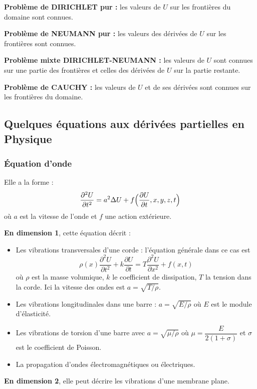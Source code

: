 \textbf{Problème de DIRICHLET pur :} les valeurs de $U$ sur les frontières du
domaine sont connues.

\textbf{Problème de NEUMANN pur :} les valeurs des dérivées de $U$ sur les
frontières sont connues.

\textbf{Problème mixte DIRICHLET-NEUMANN :} les valeurs de $U$ sont connues
sur une partie des frontières et celles des dérivées de $U$ sur la partie
restante.

\textbf{Problème de CAUCHY :} les valeurs de $U$ et de ses dérivées sont
connues sur les frontières du domaine.

\subsection{Quelques équations aux dérivées partielles en Physique}

\subsubsection{Équation d'onde}

Elle a la forme :
\[
  \frac{\partial^2 U}{\partial t^2} = a^2\Delta U
  + f\Bigl(\frac{\partial U}{\partial t}, x, y, z, t\Bigr)
\]
où $a$ est la vitesse de l'onde et $f$ une action extérieure.

\textbf{En dimension 1}, cette équation décrit :
\begin{itemize}[label=--]
  \item Les vibrations transversales d'une corde : l'équation générale dans ce
        cas est
        \[
          \rho(x)\frac{\partial^2 U}{\partial t^2} + k\frac{\partial U}{\partial t}
          = T\frac{\partial^2 U}{\partial x^2} + f(x,t)
        \]
        où $\rho$ est la masse volumique, $k$ le coefficient de dissipation,
        $T$ la tension dans la corde. Ici la vitesse des ondes est
        $a = \sqrt{T/\rho}$.
  \item Les vibrations longitudinales dans une barre : $a = \sqrt{E/\rho}$ où
        $E$ est le module d'élasticité.
  \item Les vibrations de torsion d'une barre avec $a = \sqrt{\mu/\rho}$ où
        $\mu = \dfrac{E}{2(1+\sigma)}$ et $\sigma$ est le coefficient de
        Poisson.
  \item La propagation d'ondes électromagnétiques ou électriques.
\end{itemize}

\textbf{En dimension 2}, elle peut décrire les vibrations d'une membrane
plane.

